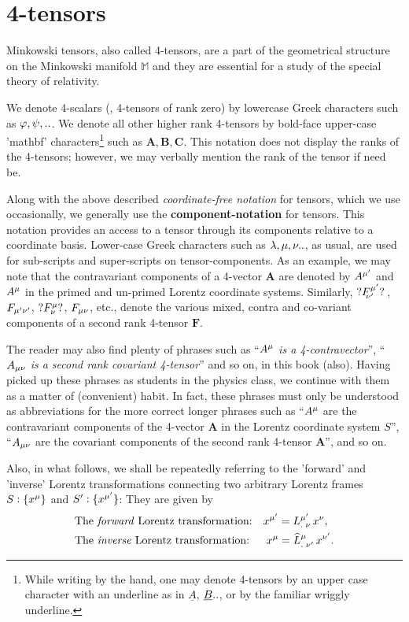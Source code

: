 \section{4-tensors}
Minkowski tensors, also called 4-tensors, are a part of 
the geometrical structure on the Minkowski manifold 
$\mathbb{M}$ and they are essential for a study of the 
special theory of relativity.

 We denote 4-scalars (\ie, 4-tensors of 
rank zero) by  lowercase Greek characters such as 
$\varphi, \psi, ..$. We denote all other higher rank 
4-tensors by bold-face upper-case 'mathbf' 
characters\footnote{While writing by the hand, one may 
denote 4-tensors by an upper case character with an 
underline as in $\underline{A}$, $\underline{B}..$, or 
by the familiar wriggly underline.} such as 
$\mathbf{A}, \mathbf{B}, \mathbf{C}$. This notation 
does not display the ranks of the 4-tensors; however, 
we may verbally mention the rank of the tensor if need 
be. 

Along with the above described \textsl{coordinate-free 
notation} for tensors, which we use occasionally,  we 
generally use the \textbf{compo\-nent-notation} for 
tensors. This notation provides an access to a tensor 
through its components relative to a coordinate basis.
Lower-case Greek characters such as ${\lambda}, {\mu}, {\nu} ..$, 
as usual,  are used for sub-scripts and super-scripts on 
tensor-components. As an example, we  may note that the 
contravariant components of a 4-vector $\mathbf{A}$ are 
denoted by $A^{{\mu'}}$ and $A^{{\mu}}$ in the primed and 
un-primed Lorentz coordinate systems. Similarly, 
$?F^{{\mu'}}_{\negthinspace\negthinspace{\nu'}}?$\,, $F_{{\mu'}{\nu'}}$, 
$?F^{{\mu}}_{{\nu}}?$, $F_{{\mu}{\nu}}$, etc.,  denote the 
various mixed, contra and co-variant components of a second 
rank 4-tensor $\mathbf{F}$.

The reader may also find plenty of phrases such as 
``\textsl{$A^{{\mu}}$ is a 4-contravector}'', 
``\textsl{$A_{{\mu}{\nu}}$ is a second rank covariant 
4-tensor}'' and so on, in this book (also). Having picked 
up these phrases as students in the physics class, we 
continue with them as a matter of (convenient) habit. In 
fact, these phrases must only be understood as abbreviations 
for the more correct longer phrases such as ``$A^{{\mu}}$ are 
the contravariant components of the 4-vector $\mathbf{A}$ in 
 the Lorentz coordinate system $S$\;'', ``$A_{{\mu}{\nu}}$ 
are the covariant components of the second rank 4-tensor 
$\mathbf{A}$'', and so on.

Also, in what follows, we shall be repeatedly referring to 
the 'forward' and 'inverse'  Lorentz 
transformations connecting  two arbitrary Lorentz 
frames $S:\{x^{{\mu}}\}$ and $S':\{x^{{\mu'}}\}$: They are 
given by
\begin{align}\label{mw.6}
&\text{The \textit{forward} Lorentz 
transformation:}\quad 
x^{{\mu'}} 
={{L}^{{\mu'}}_{.\;{\nu}}}\,x^{{\nu}},\\
&\text{The \textit{inverse} Lorentz 
transformation:}\;\;\quad 
x^{{\mu}} ={{{\widehat{L}}}^{{\mu}}_{.\;{\nu'}}}\,x^{{\nu'}}. 
\label{mw.7}
\end{align} 


